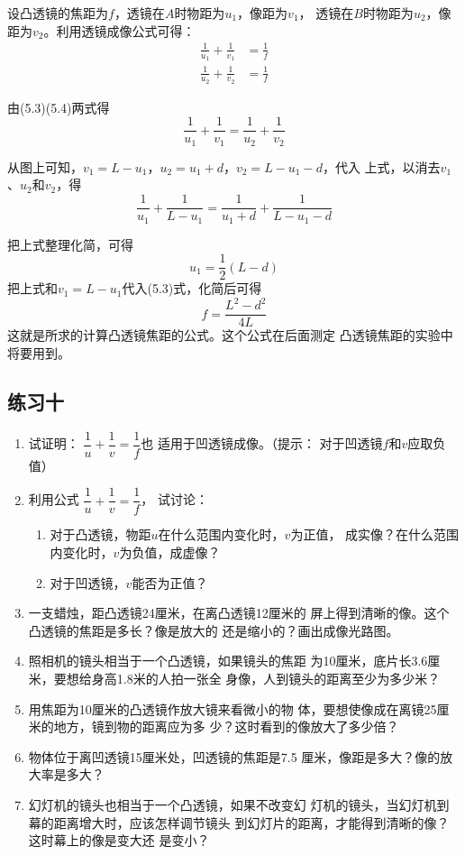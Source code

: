 \begin{solution}
    设凸透镜的焦距为$f$，透镜在$A$时物距为$u_1$，像距为$v_1$，
    透镜在$B$时物距为$u_2$，像距为$v_2$。利用透镜成像公式可得：
   \begin{align}
\frac{1}{u_1}+\frac{1}{v_1}&=\frac{1}{f}\\
\frac{1}{u_2}+\frac{1}{v_2}&=\frac{1}{f}
   \end{align}
 
    由(5.3)(5.4)两式得
\[\frac{1}{u_1}+\frac{1}{v_1}=\frac{1}{u_2}+\frac{1}{v_2} \]
    
从图上可知，$v_1=L-u_1$，$u_2=u_1+d$，$v_2=L-u_1-d$，代入
    上式，以消去$v_1$、$u_2$和$v_2$，得
    \[\frac{1}{u_1}+\frac{1}{L-u_1}=\frac{1}{u_1+d}+\frac{1}{L-u_1-d} \]

    把上式整理化简，可得
\[u_1=\frac{1}{2}(L-d) \]
    把上式和$v_1=L-u_1$代入(5.3)式，化简后可得
\[f=\frac{L^2-d^2}{4L} \]
    这就是所求的计算凸透镜焦距的公式。这个公式在后面测定
    凸透镜焦距的实验中将要用到。
\end{solution}

\subsection*{练习十}

\begin{enumerate}
    \item 试证明：
$\dfrac{1}{u}+\dfrac{1}{v}=\dfrac{1}{f}$也
适用于凹透镜成像。（提示：
对于凹透镜$f$和$v$应取负值）
\item  利用公式
$\dfrac{1}{u}+\dfrac{1}{v}=\dfrac{1}{f}$，
试讨论：
\begin{enumerate}
    \item 对于凸透镜，物距$u$在什么范围内变化时，$v$为正值，
    成实像？在什么范围内变化时，$v$为负值，成虚像？
    \item 对于凹透镜，$v$能否为正值？
\end{enumerate}
\item 一支蜡烛，距凸透镜24厘米，在离凸透镜12厘米的
屏上得到清晰的像。这个凸透镜的焦距是多长？像是放大的
还是缩小的？画出成像光路图。
\item 照相机的镜头相当于一个凸透镜，如果镜头的焦距
为10厘米，底片长3.6厘米，要想给身高1.8米的人拍一张全
身像，人到镜头的距离至少为多少米？
\item 用焦距为10厘米的凸透镜作放大镜来看微小的物
体，要想使像成在离镜25厘米的地方，镜到物的距离应为多
少？这时看到的像放大了多少倍？
\item 物体位于离凹透镜15厘米处，凹透镜的焦距是7.5
厘米，像距是多大？像的放大率是多大？
\item 幻灯机的镜头也相当于一个凸透镜，如果不改变幻
灯机的镜头，当幻灯机到幕的距离增大时，应该怎样调节镜头
到幻灯片的距离，才能得到清晰的像？这时幕上的像是变大还
是变小？
\end{enumerate}

